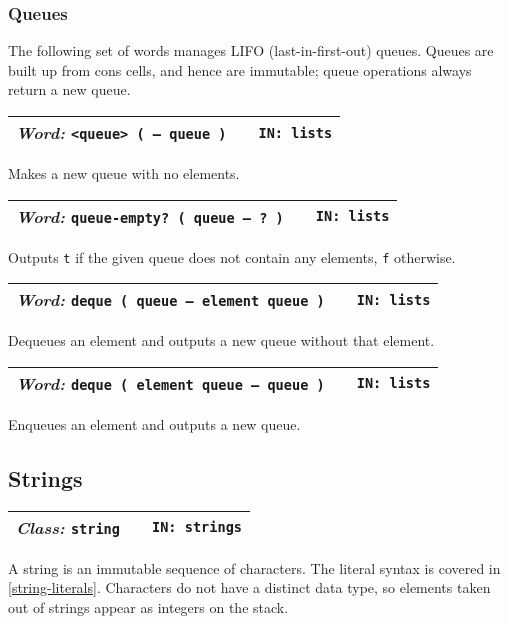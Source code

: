 \documentclass{report}
\newcommand{\ordinaryword}[3]{\index{#1}
\emph{Word:} \texttt{#2} &&\texttt{IN: #3}}
\newcommand{\classword}[2]{\index{#1}
\emph{Class:} \texttt{#1} &&\texttt{IN: #2}}
\newcommand{\wordtable}[1]{

\begin{tabularx}{12cm}[t]{lXr}
\hline
#1\\
\hline
\end{tabularx}

}
\begin{document}
\subsubsection{Queues}

The following set of words manages LIFO (last-in-first-out) queues. Queues are built up from cons cells, and hence are immutable; queue operations always return a new queue.

\wordtable{
\ordinaryword{<queue>}{<queue> ( -- queue )}{lists}
}
Makes a new queue with no elements.
\wordtable{
\ordinaryword{queue-empty?}{queue-empty? ( queue -- ?~)}{lists}
}
Outputs \texttt{t} if the given queue does not contain any elements, \texttt{f} otherwise.
\wordtable{
\ordinaryword{deque}{deque ( queue -- element queue )}{lists}
}
Dequeues an element and outputs a new queue without that element.
\wordtable{
\ordinaryword{enque}{deque ( element queue -- queue )}{lists}
}
Enqueues an element and outputs a new queue.

\subsection{Strings}

\stringglos
\wordtable{
\classword{string}{strings}
}
A string is an immutable sequence of characters. The literal syntax is covered in \ref{string-literals}. Characters do not have a distinct data type, so elements taken out of strings appear as integers on the stack.
\end{document}
